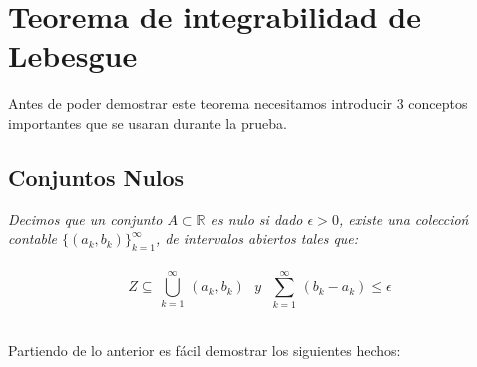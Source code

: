 \documentclass[11pt,letterpaper]{article}
\newcommand{\R}{\mathbb{R}}
\newcommand{\N}{\mathbb{N}}
\begin{document}
\section*{Teorema de integrabilidad de Lebesgue}
Antes de poder demostrar este teorema necesitamos introducir 3 conceptos importantes que se usaran durante la prueba.
\subsection*{Conjuntos Nulos}
\begin{tcolorbox}[
	title = \textcolor{black}{\textcolor{white}{Definici\'on}},]
\textit{Decimos que un conjunto $A\subset \R$ es nulo si dado $\epsilon>0$, existe una coleccio\'n contable $\{(a_k,b_k)\}_{k=1}^{\infty}$, de intervalos abiertos tales que:\,\\
\,\\
\begin{equation*}
    Z\subseteq\,\bigcup_{k=1}^{\infty}\,(a_k,b_k)\,\,\,\,y\,\,\,\,\sum_{k=1}^{\infty}\,(b_k-a_k)\leq \epsilon
\end{equation*}}
\end{tcolorbox}\,\\
Partiendo de lo anterior es fácil demostrar los siguientes hechos:
\end{document}
